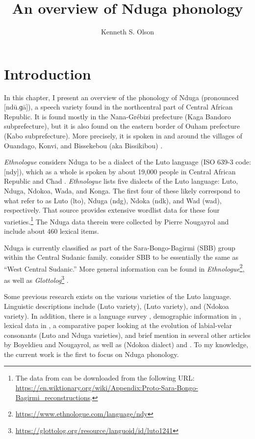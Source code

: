 \documentclass[output=paper,colorlinks,citecolor=brown
]{langscibook}
\author{Kenneth S. Olson\affiliation{SIL}}
\title{An overview of Nduga phonology}
\begin{document}
\maketitle

\section{Introduction}
\label{sec:olson:introduction}

In this chapter, I present an overview of the phonology of Nduga (pronounced [ndū.ɡā]), a speech variety found in the northcentral part of Central African Republic. It is found mostly in the Nana-Grébizi prefecture (Kaga Bandoro subprefecture), but it is also found on the eastern border of Ouham prefecture (Kabo subprefecture). More precisely, it is spoken in and around the villages of Ouandago, Konvi, and Bissekebou (aka Bissikibou) \citep[7]{moehama2021}.

\textit{Ethnologue} considers Nduga to be a dialect of the Luto language (ISO 639-3 code: [ndy]), which as a whole is spoken by about 19,000 people in Central African Republic and Chad \citep{eberhard2024}. \textit{Ethnologue} lists five dialects of the Luto language: Luto, Nduga, Ndokoa, Wada, and Konga. The first four of these likely correspond to what \citet{boyeldieuetal2006} refer to as Luto (lto), Nduga (ndg), Ndoka (ndk), and Wad (wad), respectively. That source provides extensive wordlist data for these four varieties.\footnote{The data from \citet{boyeldieuetal2006} can be downloaded from the following URL: \url{https://en.wiktionary.org/wiki/Appendix:Proto-Sara-Bongo-Bagirmi\_reconstructions}.} The Nduga data therein were collected by Pierre Nougayrol and include about 460 lexical items.

Nduga is currently classified as part of the Sara-Bongo-Bagirmi (SBB) group within the Central Sudanic family. \citet[343--344]{dimmendaal2019} consider SBB to be essentially the same as “West Central Sudanic.” More general information can be found in \textit{Ethnologue}\footnote{\url{https://www.ethnologue.com/language/ndy}}, as well as \textit{Glottolog}\footnote{\url{https://glottolog.org/resource/languoid/id/luto1241}} \citep{hammarstrom2024}.

Some previous research exists on the various varieties of the Luto language. Linguistic descriptions include \citet{moundo1975} (Luto variety), \citet{ndoko1991} (Luto variety), and \citet{mololi2011} (Ndokoa variety). In addition, there is a language survey \citep{moehama2021}, demographic information in \citet[75--77]{nougayrol1990}, lexical data in \citet{boyeldieuetal2006}, a comparative paper looking at the evolution of labial-velar consonants \citep{olson2024} (Luto and Nduga varieties), and brief mention in several other articles by Boyeldieu and Nougayrol, as well as \citet[17]{tucker1956} (Ndokoa dialect) and \citet[34]{bender1997}. To my knowledge, the current work is the first to focus on Nduga phonology.
\end{document}

